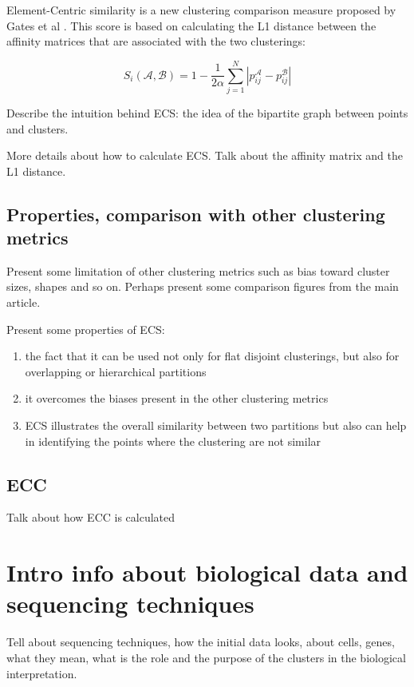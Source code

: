     Element-Centric similarity is a new clustering comparison measure proposed by Gates et al \cite{Gates2019}. This score is based on calculating the L1 distance between the affinity matrices that are associated with the two clusterings:

    \[ S_i (\mathcal{A}, \mathcal{B}) = 1 - \frac{1}{2 \alpha} \sum_{j = 1}^N |p_{ij}^{\mathcal{A}} - p_{ij}^{\mathcal{B}} | \]

    Describe the intuition behind ECS: the idea of the bipartite graph between points and clusters.

    More details about how to calculate ECS. Talk about the affinity matrix and the L1 distance.
    \subsection{Properties, comparison with other clustering metrics}
    Present some limitation of other clustering metrics such as bias toward cluster sizes, shapes and so on. Perhaps present some comparison figures from the main article.

    Present some properties of ECS:
    \begin{enumerate}
        \item the fact that it can be used not only for flat disjoint clusterings, but also for overlapping or hierarchical partitions
        \item it overcomes the biases present in the other clustering metrics
        \item ECS illustrates the overall similarity between two partitions but also can help in identifying the points where the clustering are not similar
    \end{enumerate}
    \subsection{ECC}
    Talk about how ECC is calculated

\section{Intro info about biological data and sequencing techniques}
Tell about sequencing techniques, how the initial data looks, about cells, genes, what they mean, what is the role and the purpose of the clusters in the biological interpretation.

